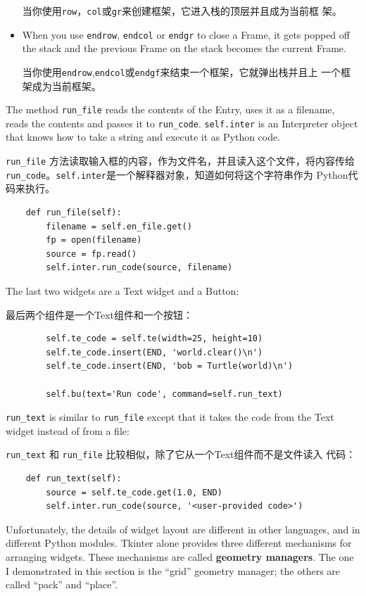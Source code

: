 \documentclass[10pt]{book}
\begin{document}
\begin{CJK}{UTF8}{gbsn}
\begin{itemize}
当你使用{\tt row}，{\tt col}或{\tt gr}来创建框架，它进入栈的顶层并且成为当前框
架。

\item When you use {\tt endrow}, {\tt endcol} or {\tt endgr} to close
a Frame, it gets popped off the stack and the previous Frame on the
stack becomes the current Frame.

当你使用{\tt endrow},{\tt endcol}或{\tt endgf}来结束一个框架，它就弹出栈并且上
一个框架成为当前框架。

\end{itemize} 

The method \verb"run_file" reads the contents of the Entry,
uses it as a filename, reads the contents
and passes it to \verb"run_code".  {\tt self.inter} is an
Interpreter object that knows how to take a string and
execute it as Python code.

\verb"run_file" 方法读取输入框的内容，作为文件名，并且读入这个文件，将内容传给
\verb"run_code"。{\tt self.inter}是一个解释器对象，知道如何将这个字符串作为
Python代码来执行。

\begin{verbatim}
    def run_file(self):
        filename = self.en_file.get()
        fp = open(filename)
        source = fp.read()
        self.inter.run_code(source, filename)
\end{verbatim}
%
The last two widgets are a Text widget and a Button:

最后两个组件是一个Text组件和一个按钮：

\begin{verbatim}
        self.te_code = self.te(width=25, height=10)
        self.te_code.insert(END, 'world.clear()\n')
        self.te_code.insert(END, 'bob = Turtle(world)\n')

        self.bu(text='Run code', command=self.run_text)
\end{verbatim}
%
\verb"run_text" is similar to \verb"run_file" except that it takes
the code from the Text widget instead of from a file:

\verb"run_text" 和 \verb"run_file" 比较相似，除了它从一个Text组件而不是文件读入
代码：

\begin{verbatim}
    def run_text(self):
        source = self.te_code.get(1.0, END)
        self.inter.run_code(source, '<user-provided code>')
\end{verbatim}
%
Unfortunately, the details of widget layout are different in
other languages, and in different Python modules.
Tkinter alone provides three different mechanisms for arranging
widgets.  These mechanisms are called {\bf geometry managers}.
The one I demonstrated in this section is the ``grid'' geometry
manager; the others are called ``pack'' and ``place''.


\end{CJK}
\end{document}
